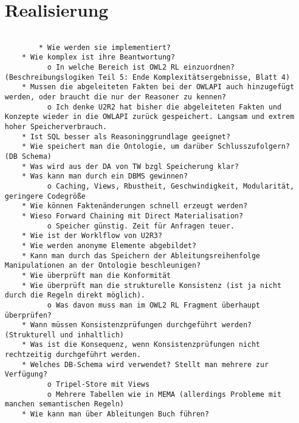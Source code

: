 \chapter{Realisierung}







\begin{verbatim}
    
        * Wie werden sie implementiert?
    * Wie komplex ist ihre Beantwortung?
          o In welche Bereich ist OWL2 RL einzuordnen? (Beschreibungslogiken Teil 5: Ende Komplexitätsergebnisse, Blatt 4) 
    * Mussen die abgeleiteten Fakten bei der OWLAPI auch hinzugefügt werden, oder braucht die nur der Reasoner zu kennen?
          o Ich denke U2R2 hat bisher die abgeleiteten Fakten und Konzepte wieder in die OWLAPI zurück gespeichert. Langsam und extrem hoher Speicherverbrauch. 
    * Ist SQL besser als Reasoninggrundlage geeignet?
    * Wie speichert man die Ontologie, um darüber Schlusszufolgern? (DB Schema)
    * Was wird aus der DA von TW bzgl Speicherung klar?
    * Was kann man durch ein DBMS gewinnen?
          o Caching, Views, Rbustheit, Geschwindigkeit, Modularität, geringere Codegröße 
    * Wie können Faktenänderungen schnell erzeugt werden?
    * Wieso Forward Chaining mit Direct Materialisation?
          o Speicher günstig. Zeit für Anfragen teuer. 
    * Wie ist der Worklflow von U2R3?
    * Wie werden anonyme Elemente abgebildet?
    * Kann man durch das Speichern der Ableitungsreihenfolge Manipulationen an der Ontologie beschleunigen?
    * Wie überprüft man die Konformität
    * Wie überprüft man die strukturelle Konsistenz (ist ja nicht durch die Regeln direkt möglich).
          o Was davon muss man im OWL2 RL Fragment überhaupt überprüfen? 
    * Wann müssen Konsistenzprüfungen durchgeführt werden? (Strukturell und inhaltlich)
    * Was ist die Konsequenz, wenn Konsistenzprüfungen nicht rechtzeitig durchgeführt werden.
    * Welches DB-Schema wird verwendet? Stellt man mehrere zur Verfügung?
          o Tripel-Store mit Views
          o Mehrere Tabellen wie in MEMA (allerdings Probleme mit manchen semantischen Regeln) 
    * Wie kann man über Ableitungen Buch führen? 
\end{verbatim}

